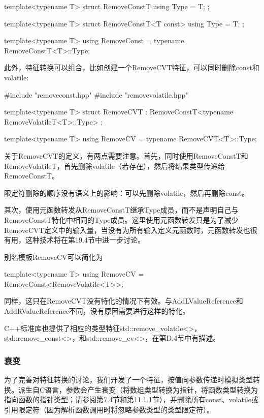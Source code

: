 \begin{cpp}
template<typename T>
struct RemoveConstT {
	using Type = T;
};

template<typename T>
struct RemoveConstT<T const> {
	using Type = T;
};

template<typename T>
using RemoveConst = typename RemoveConstT<T>::Type;
\end{cpp}

此外，特征转换可以组合，比如创建一个RemoveCVT特征，可以同时删除const和volatile:

\begin{cpp}
#include "removeconst.hpp"
#include "removevolatile.hpp"

template<typename T>
struct RemoveCVT : RemoveConstT<typename RemoveVolatileT<T>::Type> {};

template<typename T>
using RemoveCV = typename RemoveCVT<T>::Type;
\end{cpp}

关于RemoveCVT的定义，有两点需要注意。首先，同时使用RemoveConstT和RemoveVolatileT，首先删除volatile（若存在），然后将结果类型传递给RemoveConstT。

\begin{notice}
限定符删除的顺序没有语义上的影响：可以先删除volatile，然后再删除const。
\end{notice}

其次，使用元函数转发从RemoveConstT继承Type成员，而不是声明自己与RemoveConstT特化中相同的Type成员。这里使用元函数转发只是为了减少RemoveCVT定义中的输入量，当没有为所有输入定义元函数时，元函数转发也很有用，这种技术将在第19.4节中进一步讨论。

别名模板RemoveCV可以简化为

\begin{cpp}
template<typename T>
using RemoveCV = RemoveConst<RemoveVolatile<T>>;
\end{cpp}

同样，这只在RemoveCVT没有特化的情况下有效。与AddLValueReference和AddRValueReference不同，没有原因需要进行这样的特化。

C++标准库也提供了相应的类型特征std::remove\_volatile<>， std::remove\_const<>，和std::remove\_cv<>，在第D.4节中有描述。

\subsubsection{衰变}

为了完善对特征转换的讨论，我们开发了一个特征，按值向参数传递时模拟类型转换。派生自C语言，参数会产生衰变（将数组类型转换为指针，将函数类型转换为指向函数的指针类型；请参阅第7.4节和第11.1.1节），并删除所有const、volatile或引用限定符（因为解析函数调用时将忽略参数类型的类型限定符）。

